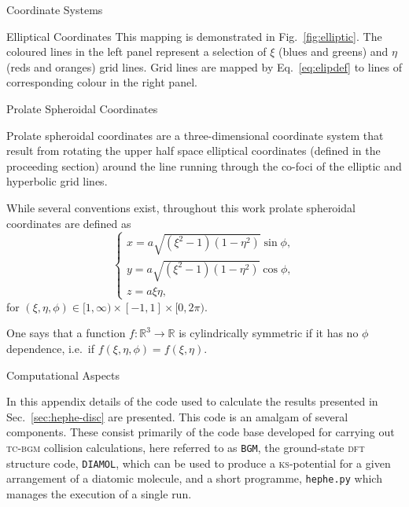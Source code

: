 \documentclass[a5paper, 9 pt]{extreport}
\begin{document}
\begin{appendices}
\begin{chapter}{Coordinate Systems \label{chap:coords}}
\begin{section}{Elliptical Coordinates \label{sec:elliptic}}
         This mapping is demonstrated in Fig.~\ref{fig:elliptic}. The coloured lines in the left panel
         represent a selection of $\xi$ (blues and greens) and $\eta$ (reds and oranges) grid lines.
         Grid lines are mapped by Eq.~\eqref{eq:elipdef} to lines of corresponding colour in the right
         panel.

      \end{section}

      \begin{section}{Prolate Spheroidal Coordinates \label{sec:prolate}}

         Prolate spheroidal coordinates are a three-dimensional coordinate system that result from
         rotating the upper half space elliptical coordinates (defined in the proceeding section) around
         the line running through the co-foci of the elliptic and hyperbolic grid lines.

         While several conventions exist, throughout this work prolate spheroidal coordinates are
         defined as
         \begin{equation} \label{eq:psc}
            \left\{
            \begin{array}{l}
               x = a \sqrt{(\xi^2 - 1)(1 - \eta^2)} \sin \phi, \\
               y = a \sqrt{(\xi^2 - 1)(1 - \eta^2)} \cos \phi, \\
               z = a \xi \eta,
            \end{array}
            \right.
         \end{equation}
         for $(\xi, \eta, \phi) \in [1, \infty) \times [-1,1] \times [0,2\pi)$.

         One says that a function $f: \mathbb{R}^3 \rightarrow \mathbb{R}$ is cylindrically symmetric if
         it has no $\phi$ dependence, i.e.\ if $f(\xi,\eta,\phi) = f(\xi,\eta)$.

      \end{section}

   \end{chapter}

   \begin{chapter}{Computational Aspects \label{chap:calcdeets}}

      In this appendix details of the code used to calculate the results presented in
      Sec.~\ref{sec:hephe-disc} are presented. This code is an amalgam of several components. These
      consist primarily of the code base developed for carrying out \textsc{tc-bgm} collision
      calculations, here referred to as \texttt{BGM}, the ground-state \textsc{dft} structure code,
      \texttt{DIAMOL}, which can be used to produce a \textsc{ks}-potential for a given arrangement of a
      diatomic molecule, and a short programme, \texttt{hephe.py} which manages the execution of a single
      run.


\end{chapter}
\end{appendices}
\end{document}
